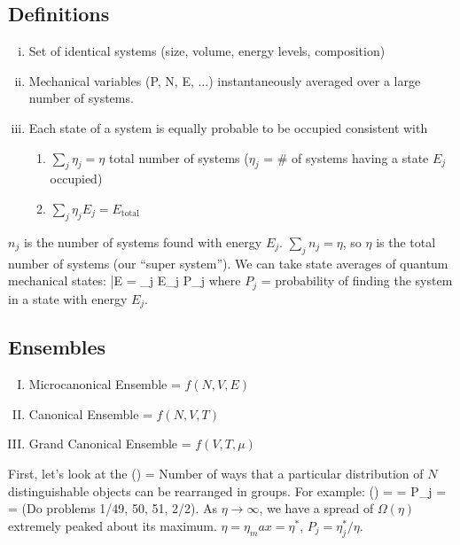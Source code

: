 \documentclass[12pt]{article}
\begin{document}
\subsection{Definitions}
\begin{enumerate}[(i)]
\item {} Set of identical systems (size, volume, energy levels, composition)
\item {} Mechanical variables (P, N, E, ...) instantaneously averaged over a large number of systems.
\item {} Each state of a system is equally probable to be occupied consistent with
\begin{enumerate}[1)]
\item $\sum_j \eta_j = \eta$ total number of systems ($\eta_j$ = \# of systems having a state $E_j$ occupied)
\item $\sum_j \eta_j E_j = E_\text{total}$
\end{enumerate}
\end{enumerate}
$n_j$ is the number of systems found with energy $E_j$.  $\sum_j n_j = \eta$, so $\eta$ is the total number of systems (our ``super system'').  We can take state averages of quantum mechanical states:
\eqs
\bar{E} = \sum_j E_j P_j
\eqe
where $P_j$ = probability of finding the system in a state with energy $E_j$.\\

\subsection{Ensembles}
\begin{enumerate}[I.]
\item Microcanonical Ensemble = $f(N,V,E)$
\item Canonical Ensemble = $f(N, V, T)$
\item Grand Canonical Ensemble = $f(V, T, \mu)$
\end{enumerate}
First, let's look at the 
\eqs
\Omega(\eta) = 
\eqe
Number of ways that a particular distribution of $N$ distinguishable objects can be rearranged in groups.  For example:
\eqs
\Omega(\eta) =  = 
\eqe
\eqs
P_j = \frac{\bar{\eta}}{\eta} =  
\eqe
(Do problems 1/49, 50, 51, 2/2).  As $\eta \rightarrow \infty$, we have a spread of $\Omega(\eta)$ extremely peaked about its maximum.  $\eta = \eta_max = \eta^*$, $P_j = \eta_j^*/\eta$.\\
\end{document}
